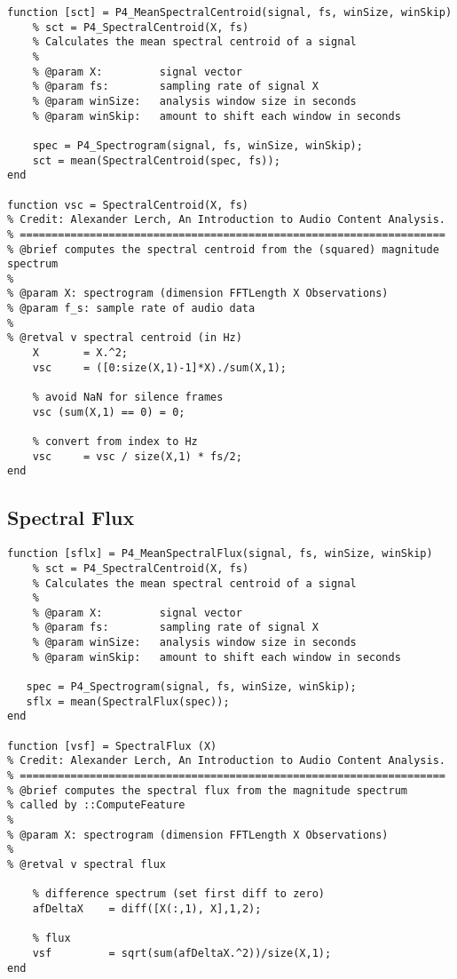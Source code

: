 \begin{lstlisting}[caption=Matlab implementation of the spectral centroid., label=snippet-speccentroid] 
function [sct] = P4_MeanSpectralCentroid(signal, fs, winSize, winSkip)
    % sct = P4_SpectralCentroid(X, fs)
    % Calculates the mean spectral centroid of a signal
    %
    % @param X:         signal vector
    % @param fs:        sampling rate of signal X
    % @param winSize:   analysis window size in seconds
    % @param winSkip:   amount to shift each window in seconds
    
    spec = P4_Spectrogram(signal, fs, winSize, winSkip);
    sct = mean(SpectralCentroid(spec, fs));
end

function vsc = SpectralCentroid(X, fs)
% Credit: Alexander Lerch, An Introduction to Audio Content Analysis.
% ===================================================================
% @brief computes the spectral centroid from the (squared) magnitude spectrum
%
% @param X: spectrogram (dimension FFTLength X Observations)
% @param f_s: sample rate of audio data 
%
% @retval v spectral centroid (in Hz)
    X       = X.^2;
    vsc     = ([0:size(X,1)-1]*X)./sum(X,1);
 
    % avoid NaN for silence frames
    vsc (sum(X,1) == 0) = 0;
 
    % convert from index to Hz
    vsc     = vsc / size(X,1) * fs/2;
end
\end{lstlisting}

\subsection{Spectral Flux}
\label{app:feat-flux}

\begin{lstlisting}[caption=Matlab implementation of the spectral flux., label=snippet-specflux]
function [sflx] = P4_MeanSpectralFlux(signal, fs, winSize, winSkip)
    % sct = P4_SpectralCentroid(X, fs)
    % Calculates the mean spectral centroid of a signal
    %
    % @param X:         signal vector
    % @param fs:        sampling rate of signal X
    % @param winSize:   analysis window size in seconds
    % @param winSkip:   amount to shift each window in seconds
    
   spec = P4_Spectrogram(signal, fs, winSize, winSkip);
   sflx = mean(SpectralFlux(spec));
end

function [vsf] = SpectralFlux (X)
% Credit: Alexander Lerch, An Introduction to Audio Content Analysis.
% ===================================================================
% @brief computes the spectral flux from the magnitude spectrum
% called by ::ComputeFeature
%
% @param X: spectrogram (dimension FFTLength X Observations)
%
% @retval v spectral flux

    % difference spectrum (set first diff to zero)
    afDeltaX    = diff([X(:,1), X],1,2);
 
    % flux
    vsf         = sqrt(sum(afDeltaX.^2))/size(X,1);
end
\end{lstlisting}

